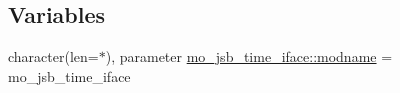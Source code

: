 \subsection*{Variables}
\begin{DoxyCompactItemize}
\item 
character(len=$\ast$), parameter \hyperlink{namespacemo__jsb__time__iface_a71db855b89fbd2a192705b32716cc869}{mo\+\_\+jsb\+\_\+time\+\_\+iface\+::modname} = \textquotesingle{}mo\+\_\+jsb\+\_\+time\+\_\+iface\textquotesingle{}
\end{DoxyCompactItemize}
